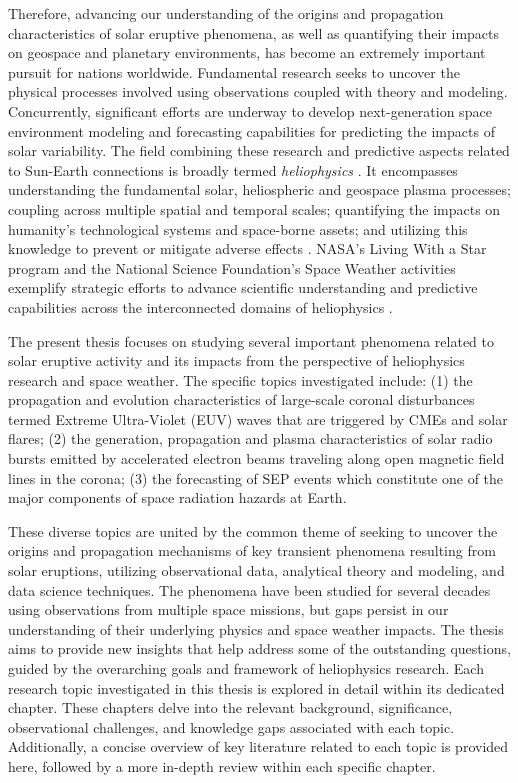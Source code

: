 Therefore, advancing our understanding of the origins and propagation characteristics of solar eruptive phenomena, as well as quantifying their impacts on geospace and planetary environments, has become an extremely important pursuit for nations worldwide. Fundamental research seeks to uncover the physical processes involved using observations coupled with theory and modeling. Concurrently, significant efforts are underway to develop next-generation space environment modeling and forecasting capabilities for predicting the impacts of solar variability. The field combining these research and predictive aspects related to Sun-Earth connections is broadly termed \textit{heliophysics} \citep{schrijver_siscoe_2010}. It encompasses understanding the fundamental solar, heliospheric and geospace plasma processes; coupling across multiple spatial and temporal scales; quantifying the impacts on humanity's technological systems and space-borne assets; and utilizing this knowledge to prevent or mitigate adverse effects \citep{schrijver_2015a, schrijver_2015b}. NASA's Living With a Star program and the National Science Foundation's Space Weather activities exemplify strategic efforts to advance scientific understanding and predictive capabilities across the interconnected domains of heliophysics \citep{brewer_2002}.

The present thesis focuses on studying several important phenomena related to solar eruptive activity and its impacts from the perspective of heliophysics research and space weather. The specific topics investigated include: (1) the propagation and evolution characteristics of large-scale coronal disturbances termed Extreme Ultra-Violet (EUV) waves that are triggered by CMEs and solar flares; (2) the generation, propagation and plasma characteristics of solar radio bursts emitted by accelerated electron beams traveling along open magnetic field lines in the corona; (3) the forecasting of SEP events which constitute one of the major components of space radiation hazards at Earth.

These diverse topics are united by the common theme of seeking to uncover the origins and propagation mechanisms of key transient phenomena resulting from solar eruptions, utilizing observational data, analytical theory and modeling, and data science techniques. The phenomena have been studied for several decades using observations from multiple space missions, but gaps persist in our understanding of their underlying physics and space weather impacts. The thesis aims to provide new insights that help address some of the outstanding questions, guided by the overarching goals and framework of heliophysics research. Each research topic investigated in this thesis is explored in detail within its dedicated chapter. These chapters delve into the relevant background, significance, observational challenges, and knowledge gaps associated with each topic. Additionally, a concise overview of key literature related to each topic is provided here, followed by a more in-depth review within each specific chapter.

